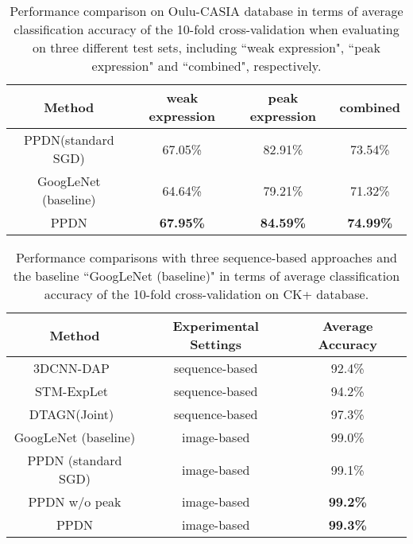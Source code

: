 \documentclass[runningheads]{llncs}
\begin{document}
\begin{table}[!tp]\setlength{\tabcolsep}{0.5pt}
	\begin{center}
		\caption{Performance comparison on Oulu-CASIA database in terms of average classification accuracy of the 10-fold cross-validation when evaluating on three different test sets, including ``weak expression", ``peak expression" and ``combined", respectively.}
		\label{table:oulu_compare}
		\begin{tabular}{c|c|c|c}
			\hline\noalign{\smallskip}
			Method & weak expression & peak expression & combined\\
			\hline
			PPDN(standard SGD) &  67.05\% & 82.91\% &73.54\%\\	
			GoogLeNet (baseline) & 64.64\%& 79.21\% &71.32\%\\
			\hline
			PPDN  & \textbf{67.95\%}&\textbf{84.59\%} & \textbf{74.99\%}\\
			\hline
		\end{tabular}
	\end{center}
\end{table}

\begin{table}[t]
	\begin{center}
		\caption{Performance comparisons with three sequence-based approaches and the baseline ``GoogLeNet (baseline)" in terms of average classification accuracy of the 10-fold cross-validation on CK+ database. }
		\label{table:ck_sequence}
		\begin{tabular}{c|c|c}
			\hline\noalign{\smallskip}
			Method & Experimental Settings & Average Accuracy\\
			\hline
			3DCNN-DAP~\cite{liu2014deeply}&sequence-based&92.4\%\\
			STM-ExpLet~\cite{liu2014learning}& sequence-based & 94.2\%\\
			DTAGN(Joint)~\cite{jung2015joint} & sequence-based & 97.3\%\\
			GoogLeNet (baseline) & image-based & 99.0\%\\
			PPDN (standard SGD) & image-based & 99.1\%\\
			\hline
			PPDN w/o peak & image-based & \textbf{99.2\%}\\
			PPDN  & image-based & \textbf{99.3\%}\\
			\hline
		\end{tabular}
	\end{center}
\end{table}
\end{document}
